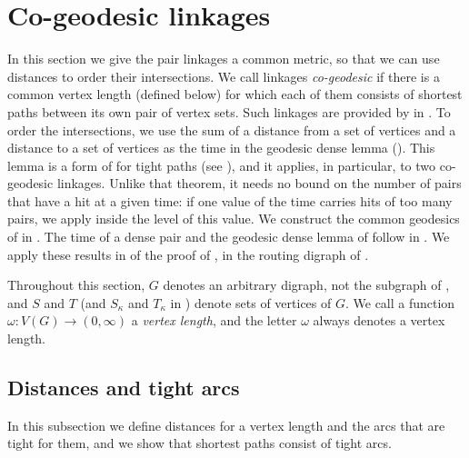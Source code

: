 \documentclass[fontsize=12pt,leading=14pt]{fullpaper}
\newcounter{step}
\begin{document}
%
\newcommand{\gload}{\operatorname{load}}

\section{Co-geodesic linkages}\label{sec:geo}

In this section we give the pair linkages a common metric, so that we can use distances to order their intersections.
We call linkages \emph{co-geodesic} if there is a common vertex length (defined below) for which each of them consists of shortest paths between its own pair of vertex sets.
Such linkages are provided by  in .
To order the intersections, we use the sum of a distance from a set of vertices and a distance to a set of vertices as the time in the geodesic dense lemma ().
This lemma is a form of  for tight paths (see ), and it applies, in particular, to two co-geodesic linkages.
Unlike that theorem, it needs no bound on the number of pairs that have a hit at a given time: if one value of the time carries hits of too many pairs, we apply  inside the level of this value.
We construct the common geodesics of  in .
The time of a dense pair and the geodesic dense lemma of  follow in .
We apply these results in  of the proof of , in the routing digraph of .

Throughout this section, $G$ denotes an arbitrary digraph, not the subgraph of , and $S$ and $T$ (and $S_\kappa$ and $T_\kappa$ in ) denote sets of vertices of $G$.
We call a function $\omega\colon V(G)\to(0,\infty)$ a \emph{vertex length}, and the letter $\omega$ always denotes a vertex length.
\subsection{Distances and tight arcs}\label{sec:geo-tight}

In this subsection we define distances for a vertex length and the arcs that are tight for them, and we show that shortest paths consist of tight arcs.
\end{document}
